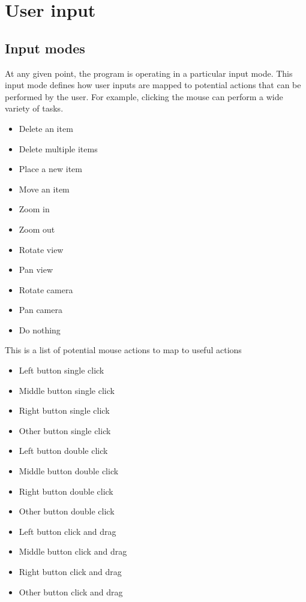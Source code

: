 \documentclass[letterpaper,12pt,twoside]{book}
\begin{document}
\chapter {User input}

\section {Input modes}
At any given point, the program is operating in a particular input mode. This input mode defines how user inputs are mapped to potential actions that can be performed by the user. For example, clicking the mouse can perform a wide variety of tasks.
\begin {itemize}
\item Delete an item
\item Delete multiple items
\item Place a new item
\item Move an item
\item Zoom in
\item Zoom out
\item Rotate view
\item Pan view
\item Rotate camera
\item Pan camera
\item Do nothing
\end {itemize}

This is a list of potential mouse actions to map to useful actions
\begin {itemize}
\item Left button single click
\item Middle button single click
\item Right button single click
\item Other button single click
\item Left button double click
\item Middle button double click
\item Right button double click
\item Other button double click
\item Left button click and drag
\item Middle button click and drag
\item Right button click and drag
\item Other button click and drag
\end {itemize}
\end{document}
